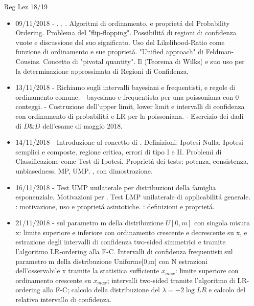 \begin{frame}[allowframebreaks]{Reg Lez 18/19}
\begin{itemize}
    \item 09/11/2018 - . , . Algoritmi di ordinamento, e propriet\'a del Probability Ordering. Problema del "flip-flopping". Possibilit\'a di regioni di confidenza vuote e discussione del suo significato. Uso del Likelihood-Ratio come funzione di ordinamento e sue propriet\'a. "Unified approach" di Feldman-Cousins. Concetto di "pivotal quantity". Il  (Teorema di Wilks) e suo uso per la determinazione approssimata di Regioni di Confidenza.
    
    \item 13/11/2018 - Richiamo sugli intervalli bayesiani e frequentisti, e regole di ordinamento comune. -  bayesiano e frequentista per una poissoniana con 0 conteggi. - Costruzione dell'upper limit, lower limit e intervalli di confidenza con ordinamento di probabilit\'a e LR per la poissoniana. - Esercizio dei dadi di $D\&D$ dell'esame di maggio 2018.
    
    \item 14/11/2018 - Introduzione al concetto di . Definizioni: Ipotesi Nulla, Ipotesi semplici e composte, regione critica, errori di tipo I e II. Problemi di Classificazione come Test di Ipotesi. Propriet\'a dei tests: potenza, consistenza, unbiasedness, MP, UMP. , con dimostrazione.
    
    \item 16/11/2018 - Test UMP unilaterale per distribuzioni della famiglia esponenziale. Motivazioni per . Test LMP unilaterale di applicabilit\'a generale. : motivazione, uso e propriet\'a asintotiche. : definizioni e propriet\'a.
    
    \item 21/11/2018 -  sul parametro m della distribuzione $U[0,m]$ con singola misura x: limite superiore e inferiore con ordinamento crescente e decrescente su x, e estrazione degli intervalli di confidenza two-sided simmetrici e tramite l’algoritmo LR-ordering alla F-C. Intervalli di confidenza frequentisti sul parametro m della distribuzione Uniforme[0,m] con N estrazioni dell’osservabile x tramite la statistica sufficiente $x_{max}$: limite superiore con ordinamento crescente su $x_{max}$; intervalli two-sided tramite l’algoritmo di LR-ordering alla F-C; calcolo della distribuzione del $\lambda=-2\log{LR}$ e calcolo del relativo intervallo di confidenza.
    

\end{itemize}
\end{frame}
